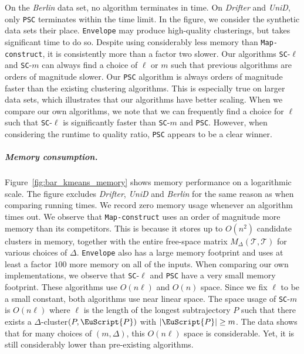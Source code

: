\documentclass[11pt]{article}
\newcommand{\fancy}[1]{\EuScript{#1}}
\newcommand{\pathlet}{cluster\xspace}
\newcommand{\pathlets}{clusters\xspace}
\begin{document}
On the \emph{Berlin} data set, no algorithm terminates in time.
On \emph{Drifter} and \emph{UniD}, only \texttt{PSC} terminates within the time limit. In the figure, we consider the synthetic data sets their place. 
%
%
\texttt{Envelope} may produce high-quality clusterings, but takes significant time to do so. 
Despite using considerably less memory than \texttt{Map-construct}, it is consistently more than a factor two slower.
Our algorithms \texttt{SC}-$\ell$ and \texttt{SC}-$m$ can always find a choice of $\ell$ or $m$ such that previous algorithms are orders of magnitude slower. 
Our \texttt{PSC} algorithm is always orders of magnitude faster than the existing clustering algorithms. 
This is especially true on larger data sets, which illustrates that our algorithms have better scaling. 
%
When we compare our own algorithms, we note that we can frequently find a choice for $\ell$ such that \texttt{SC}-$\ell$ is significantly faster than \texttt{SC}-$m$ and \texttt{PSC}.
However, when considering the runtime  to quality ratio, \texttt{PSC} appears to be a clear winner. 
%
%
\subparagraph{Memory consumption.}
Figure~\ref{fig:bar_kmeans_memory} shows memory performance on a logarithmic scale. The figure excludes \emph{Drifter}, \emph{UniD} and \emph{Berlin} for the same reason as when comparing running times. 
We record zero memory usage whenever an algorithm times out. 
%
%
We observe that \texttt{Map-construct} uses an order of magnitude more memory than its competitors. This is because it stores up to $O(n^2)$ candidate \pathlets
in memory, together with the entire free-space matrix $M_\Delta(\mathcal{T}, \mathcal{T})$ for various choices of $\Delta$. \texttt{Envelope} also has a large memory footprint and uses at least a factor $100$ more memory on all of the inputs. 
%
When comparing our own implementations, we observe that \texttt{SC}-$\ell$ and \texttt{PSC} have a very small memory footprint.
These algorithms use $O(n \ell)$ and $O(n)$ space. Since we fix $\ell$ to be a small constant, both algorithms use near linear space.  
The space usage of \texttt{SC}-$m$ is $O(n \ell)$ where $\ell$ is the length of the longest subtrajectory $P$ such that there exists a $\Delta$-\pathlet $(P, {\fancy{P}})$ with $|{\fancy{P}}| \geq m$. 
The data shows that for many choices of $(m, \Delta)$, this $O(n \ell)$ space is considerable. Yet, it is still considerably lower than pre-existing algorithms.
%
\end{document}
